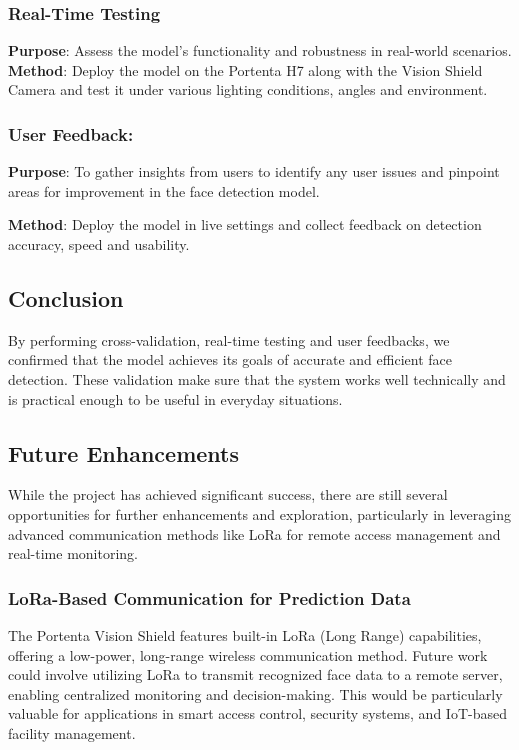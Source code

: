 \subsubsection{Real-Time Testing}
\textbf{Purpose}: Assess the model's functionality and robustness in real-world scenarios.
\\\textbf{Method}: Deploy the model on the Portenta H7 along with the Vision Shield Camera and test it under various lighting conditions, angles and environment.

\subsubsection{User Feedback:}
\textbf{Purpose}: To gather insights from users to identify any user issues and pinpoint areas for improvement in the face detection model.

\textbf{Method}: Deploy the model in live settings and collect feedback on detection accuracy, speed and usability.

\subsection{Conclusion}
By performing cross-validation, real-time testing and user feedbacks, we confirmed that the model achieves its goals of accurate and efficient face detection. These validation make sure that the system works well technically and is practical enough to be useful in everyday situations.

\subsection{Future Enhancements}
While the project has achieved significant success, there are still several opportunities for further enhancements and exploration, particularly in leveraging advanced communication methods like LoRa for remote access management and real-time monitoring.

\subsubsection{LoRa-Based Communication for Prediction Data}

The Portenta Vision Shield features built-in LoRa (Long Range) capabilities, offering a low-power, long-range wireless communication method. Future work could involve utilizing LoRa to transmit recognized face data to a remote server, enabling centralized monitoring and decision-making. This would be particularly valuable for applications in smart access control, security systems, and IoT-based facility management.

